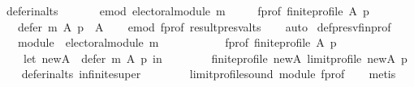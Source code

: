 \begin{isabellebody}
%
\isadelimproof
\isanewline
%
\endisadelimproof
\isanewline
{}\isamarkupfalse%
\ defer{\isacharunderscore}{\kern0pt}in{\isacharunderscore}{\kern0pt}alts{\isacharcolon}{\kern0pt}\isanewline
\ \ \isanewline
\ \ \ \ e{\isacharunderscore}{\kern0pt}mod{\isacharcolon}{\kern0pt}\ {\isachardoublequoteopen}electoral{\isacharunderscore}{\kern0pt}module\ m{\isachardoublequoteclose}\ \isanewline
\ \ \ \ f{\isacharunderscore}{\kern0pt}prof{\isacharcolon}{\kern0pt}\ {\isachardoublequoteopen}finite{\isacharunderscore}{\kern0pt}profile\ A\ p{\isachardoublequoteclose}\isanewline
\ \ \ {\isachardoublequoteopen}defer\ m\ A\ p\ {\isasymsubseteq}\ A{\isachardoublequoteclose}\isanewline
%
\isadelimproof
\ \ %
\endisadelimproof
%
\isatagproof
{}\isamarkupfalse%
\ e{\isacharunderscore}{\kern0pt}mod\ f{\isacharunderscore}{\kern0pt}prof\ result{\isacharunderscore}{\kern0pt}presv{\isacharunderscore}{\kern0pt}alts\isanewline
\ \ \isamarkupfalse%
\ auto%
\endisatagproof
{\isafoldproof}%
%
\isadelimproof
\isanewline
%
\endisadelimproof
\isanewline
{}\isamarkupfalse%
\ def{\isacharunderscore}{\kern0pt}presv{\isacharunderscore}{\kern0pt}fin{\isacharunderscore}{\kern0pt}prof{\isacharcolon}{\kern0pt}\isanewline
\ \ \ module{\isacharcolon}{\kern0pt}\ \ {\isachardoublequoteopen}electoral{\isacharunderscore}{\kern0pt}module\ m{\isachardoublequoteclose}\ \isanewline
\ \ \ \ \ \ \ \ \ \ f{\isacharunderscore}{\kern0pt}prof{\isacharcolon}{\kern0pt}\ {\isachardoublequoteopen}finite{\isacharunderscore}{\kern0pt}profile\ A\ p{\isachardoublequoteclose}\isanewline
\ \ \isanewline
\ \ \ \ {\isachardoublequoteopen}let\ new{\isacharunderscore}{\kern0pt}A\ {\isacharequal}{\kern0pt}\ defer\ m\ A\ p\ in\isanewline
\ \ \ \ \ \ \ \ finite{\isacharunderscore}{\kern0pt}profile\ new{\isacharunderscore}{\kern0pt}A\ {\isacharparenleft}{\kern0pt}limit{\isacharunderscore}{\kern0pt}profile\ new{\isacharunderscore}{\kern0pt}A\ p{\isacharparenright}{\kern0pt}{\isachardoublequoteclose}\isanewline
%
\isadelimproof
\ \ %
\endisadelimproof
%
\isatagproof
{}\isamarkupfalse%
\ defer{\isacharunderscore}{\kern0pt}in{\isacharunderscore}{\kern0pt}alts\ infinite{\isacharunderscore}{\kern0pt}super\isanewline
\ \ \ \ \ \ \ \ limit{\isacharunderscore}{\kern0pt}profile{\isacharunderscore}{\kern0pt}sound\ module\ f{\isacharunderscore}{\kern0pt}prof\isanewline
\ \ \isamarkupfalse%
\ metis%
\endisatagproof
{\isafoldproof}%
%
\isadelimproof

\end{isabellebody}

